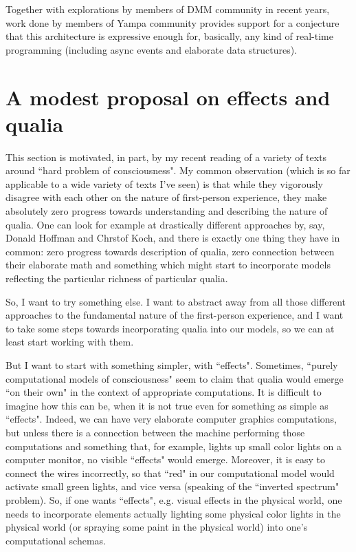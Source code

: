 \documentclass{article}
\begin{document}
Together with explorations by members of DMM community in recent years, work done by members of Yampa community
provides support for a conjecture that this architecture is expressive enough for, basically, any kind of
real-time programming (including async events and elaborate data structures).

\section{A modest proposal on effects and qualia}

This section is motivated, in part, by my recent reading of a variety of texts around ``hard problem of
consciousness". My common observation (which is so far applicable to a wide variety of texts I've seen) is that
while they vigorously disagree with each other on the nature of first-person experience, they make
absolutely zero progress towards understanding and describing the nature of qualia. One can look for
example at drastically different approaches by, say, Donald Hoffman and Chrstof Koch, and there is
exactly one thing they have in common: zero progress towards description of qualia, zero connection between
their elaborate math and something which might start to incorporate models reflecting the particular
richness of particular qualia.

So, I want to try something else. I want to abstract away from all those different approaches to the
fundamental nature of the first-person experience, and I want to take some steps towards incorporating
qualia into our models, so we can at least start working with them. 

But I want to start with something simpler, with ``effects". Sometimes, ``purely computational models
of consciousness" seem to claim that qualia would emerge ``on their own" in the context of appropriate
computations. It is difficult to imagine how this can be, when it is not true even for something as
simple as ``effects". Indeed, we can have very elaborate computer graphics computations, but unless
there is a connection between the machine performing those computations and something that, for example,
lights up small color lights on a computer monitor, no visible ``effects" would emerge. Moreover, it is
easy to connect the wires incorrectly, so that ``red" in our computational model would activate
small green lights, and vice versa (speaking of the ``inverted spectrum" problem). So, if one wants
``effects", e.g. visual effects in the physical world, one needs to incorporate elements actually
lighting some physical color lights in the physical world (or spraying some paint
in the physical world) into one's computational schemas.
\end{document}
